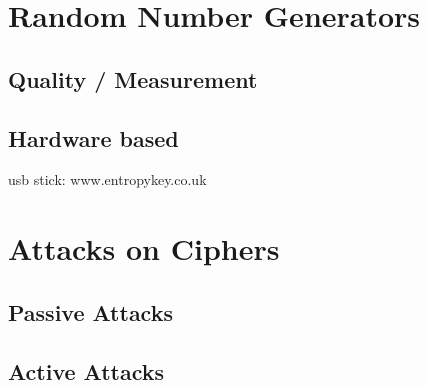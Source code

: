 \section{Random Number Generators}

\subsection{Quality / Measurement}

\subsection{Hardware based}

usb stick: 
www.entropykey.co.uk


\section{Attacks on Ciphers}

\subsection{Passive Attacks}

\subsection{Active Attacks}